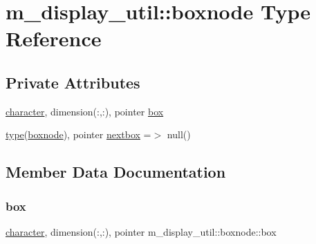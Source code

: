 \hypertarget{structm__display__util_1_1boxnode}{}\section{m\+\_\+display\+\_\+util\+:\+:boxnode Type Reference}
\label{structm__display__util_1_1boxnode}
\subsection*{Private Attributes}
\begin{DoxyCompactItemize}
\item 
\hyperlink{option__stopwatch_83_8txt_abd4b21fbbd175834027b5224bfe97e66}{character}, dimension(\+:,\+:), pointer \hyperlink{structm__display__util_1_1boxnode_a370dd4c2505b16a7e740eb84823b943a}{box}
\item 
\hyperlink{stop__watch_83_8txt_a70f0ead91c32e25323c03265aa302c1c}{type}(\hyperlink{structm__display__util_1_1boxnode}{boxnode}), pointer \hyperlink{structm__display__util_1_1boxnode_a66de6cb2ce074d35d978a4ac8f3bd29e}{nextbox} =$>$ null()
\end{DoxyCompactItemize}


\subsection{Member Data Documentation}
\mbox{\label{structm__display__util_1_1boxnode_a370dd4c2505b16a7e740eb84823b943a}} 
\subsubsection{\texorpdfstring{box}{box}}
{\footnotesize\ttfamily \hyperlink{option__stopwatch_83_8txt_abd4b21fbbd175834027b5224bfe97e66}{character}, dimension(\+:,\+:), pointer m\+\_\+display\+\_\+util\+::boxnode\+::box\hspace{0.3cm}{\ttfamily [private]}}

\mbox{\label{structm__display__util_1_1boxnode_a66de6cb2ce074d35d978a4ac8f3bd29e}} 
